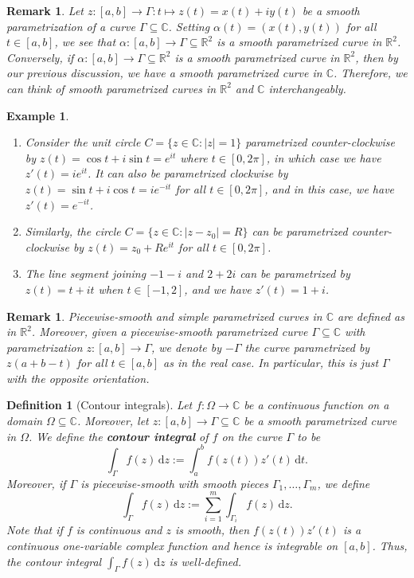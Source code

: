 \documentclass[10pt]{article}
\newcommand{\R}{\mathbb{R}}
\newcommand{\C}{\mathbb{C}}
\newcommand{\dd}{\,\mathrm{d}}
\theoremstyle{newstyle}
\newtheorem{remark}[thm]{Remark}
\newtheorem{defn}[thm]{Definition}
\newtheorem{exmp}[thm]{Example}
\begin{document}
\begin{remark}
Let $z : [a, b] \to \Gamma : t \mapsto z(t) = x(t) + iy(t)$ be a smooth parametrization of a curve 
$\Gamma \subseteq \C$. Setting $\alpha(t) = (x(t), y(t))$ for all $t \in [a, b]$, we see that 
$\alpha : [a, b] \to \Gamma \subseteq \R^2$ is a smooth parametrized curve in $\R^2$. 
Conversely, if $\alpha : [a, b] \to \Gamma \subseteq \R^2$ is a smooth parametrized curve 
in $\R^2$, then by our previous discussion, we have a smooth parametrized curve in $\C$. 
Therefore, we can think of smooth parametrized curves in $\R^2$ and $\C$ interchangeably. 
\end{remark}

\newpage 
\begin{exmp}~
\begin{enumerate}[(1)]
    \item Consider the unit circle $C = \{z \in \C : |z| = 1\}$ parametrized counter-clockwise by 
    $z(t) = \cos t + i\sin t = e^{it}$ where $t \in [0, 2\pi]$, in which case we have 
    $z'(t) = ie^{it}$. It can also be parametrized clockwise by $z(t) = \sin t + i\cos t = 
    ie^{-it}$ for all $t \in [0, 2\pi]$, and in this case, we have $z'(t) = e^{-it}$. 
    \item Similarly, the circle $C = \{z \in \C : |z - z_0| = R\}$ can be parametrized counter-clockwise
    by $z(t) = z_0 + Re^{it}$ for all $t \in [0, 2\pi]$. 
    \item The line segment joining $-1 - i$ and $2 + 2i$ can be parametrized by 
    $z(t) = t+it$ when $t \in [-1, 2]$, and we have $z'(t) = 1+i$. 
\end{enumerate}
\end{exmp}

\begin{remark}
Piecewise-smooth and simple parametrized curves in $\C$ are defined as in $\R^2$. Moreover, 
given a piecewise-smooth parametrized curve $\Gamma \subseteq \C$ with parametrization 
$z : [a, b] \to \Gamma$, we denote by $-\Gamma$ the curve parametrized by 
$z(a+b-t)$ for all $t \in [a, b]$ as in the real case. In particular, this is just $\Gamma$ 
with the opposite orientation. 
\end{remark}

\begin{defn}[Contour integrals]
Let $f : \Omega \to \C$ be a continuous function on a domain $\Omega \subseteq \C$. 
Moreover, let $z : [a, b] \to \Gamma \subseteq \C$ be a smooth parametrized curve in $\Omega$. 
We define the {\bf contour integral} of $f$ on the curve $\Gamma$ to be 
\[ \int_\Gamma f(z)\dd z := \int_a^b f(z(t))z'(t)\dd t.\]
Moreover, if $\Gamma$ is piecewise-smooth with smooth pieces $\Gamma_1, \dots, \Gamma_m$, we define 
\[ \int_\Gamma f(z)\dd z := \sum_{i=1}^m \int_{\Gamma_i} f(z)\dd z. \]
Note that if $f$ is continuous and $z$ is smooth, then $f(z(t))z'(t)$ is a continuous 
one-variable complex function and hence is integrable on $[a, b]$. Thus, the 
contour integral $\int_\Gamma f(z)\dd z$ is well-defined. 
\end{defn}
\end{document}
